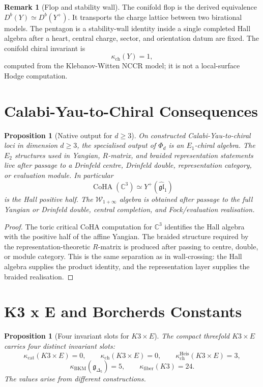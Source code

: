 \documentclass[11pt]{article}
\newtheorem{proposition}[theorem]{Proposition}
\theoremstyle{definition}
\newtheorem{remark}[theorem]{Remark}
\providecommand{\C}{\mathbb{C}}
\providecommand{\CoHA}{\operatorname{CoHA}}
\providecommand{\kch}{\kappa_{\mathrm{ch}}}
\providecommand{\kcat}{\kappa_{\mathrm{cat}}}
\providecommand{\kBKM}{\kappa_{\mathrm{BKM}}}
\providecommand{\kfib}{\kappa_{\mathrm{fiber}}}
\providecommand{\Eone}{E_1}
\providecommand{\Etwo}{E_2}
\providecommand{\fg}{\mathfrak{g}}
\providecommand{\Yplus}{Y^+}
\begin{document}
\begin{remark}[Flop and stability wall]
The conifold flop is the derived equivalence
$D^b(Y)\simeq D^b(Y^+)$.  It transports the charge lattice between two
birational models.  The pentagon is a stability-wall identity inside a
single completed Hall algebra after a heart, central charge, sector, and
orientation datum are fixed.  The conifold chiral invariant is
\[
 \kch(Y)=1,
\]
computed from the Klebanov-Witten NCCR model; it is not a local-surface
Hodge computation.
\end{remark}

\section{Calabi-Yau-to-Chiral Consequences}

\begin{proposition}[Native output for $d\geq 3$]
\label{prop:d3-output}
On constructed Calabi-Yau-to-chiral loci in dimension $d\geq 3$, the
specialised output of $\Phi_d$ is an $\Eone$-chiral algebra.  The
$\Etwo$ structures used in Yangian, $R$-matrix, and braided
representation statements live after passage to a Drinfeld centre,
Drinfeld double, representation category, or evaluation module.  In
particular
\[
 \CoHA(\C^3)\simeq \Yplus(\widehat{\mathfrak{gl}}_1)
\]
is the Hall positive half.  The $\mathcal W_{1+\infty}$ algebra is
obtained after passage to the full Yangian or Drinfeld double, central
completion, and Fock/evaluation realisation.
\end{proposition}

\begin{proof}
The toric critical CoHA computation for $\C^3$ identifies the Hall
algebra with the positive half of the affine Yangian.  The braided
structure required by the representation-theoretic $R$-matrix is
produced after passing to centre, double, or module category.  This is
the same separation as in wall-crossing: the Hall algebra supplies the
product identity, and the representation layer supplies the braided
realisation.
\end{proof}

\section{K3 x E and Borcherds Constants}

\begin{proposition}[Four invariant slots for $K3\times E$]
\label{prop:k3xe-four-slots}
The compact threefold $K3\times E$ carries four distinct invariant
slots:
\[
 \kcat(K3\times E)=0,\qquad
 \kch(K3\times E)=0,\qquad
 \kch^{\mathrm{Heis}}(K3\times E)=3,
\]
\[
 \kBKM(\fg_{\Delta_5})=5,\qquad
 \kfib(K3)=24.
\]
The values arise from different constructions.
\end{proposition}
\end{document}
